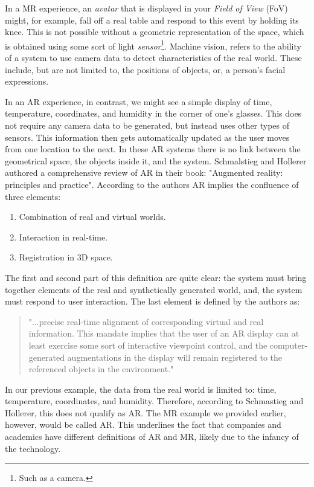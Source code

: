 In a MR experience, an \textit{avatar} that is displayed in your \textit{Field of View} (FoV) might, for example, fall off a real table and respond to this event by holding its knee. This is not possible without a geometric representation of the space, which is obtained using some sort of light \textit{sensor}\footnote{Such as a camera.}. Machine vision, refers to the ability of a system to use camera data to detect characteristics of the real world. These include, but are not limited to, the positions of objects, or, a person's facial expressions.

In an AR experience, in contrast, we might see a simple display of time, temperature, coordinates, and humidity in the corner of one's glasses. This does not require any camera data to be generated, but instead uses other types of sensors. This information then gets automatically updated as the user moves from one location to the next. In these AR systems there is no link between the geometrical space, the objects inside it, and the system. Schmalstieg and Hollerer \cite{schmalstieg2016augmented} authored a comprehensive review of AR in their book: "Augmented reality: principles and practice". According to the authors AR implies the confluence of three elements:

\begin{enumerate}
    \item Combination of real and virtual worlds. 
    \item Interaction in real-time.
    \item Registration in 3D space. 
\end{enumerate}

The first and second part of this definition are quite clear: the system must bring together elements of the real and synthetically generated world, and, the system must respond to user interaction. The last element is defined by the authors as: 

\begin{quote}
    "...precise real-time alignment of corresponding virtual and real information. This mandate implies that the user of an AR display can at least exercise some sort of interactive viewpoint control, and the computer-generated augmentations in the display will remain registered to the referenced objects in the environment."
\end{quote}

In our previous example, the data from the real world is limited to: time, temperature, coordinates, and humidity. Therefore, according to Schmastieg and Hollerer, this does not qualify as AR. The MR example we provided earlier, however, would be called AR. This underlines the fact that companies and academics have different definitions of AR and MR, likely due to the infancy of the technology. 

